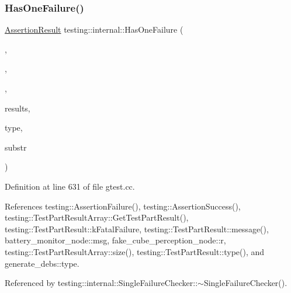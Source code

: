 \subsubsection{\texorpdfstring{Has\+One\+Failure()}{HasOneFailure()}}
{\footnotesize\ttfamily \hyperlink{classtesting_1_1AssertionResult}{Assertion\+Result} testing\+::internal\+::\+Has\+One\+Failure (\begin{DoxyParamCaption}\item[{const char $\ast$}]{,  }\item[{const char $\ast$}]{,  }\item[{const char $\ast$}]{,  }\item[{const \hyperlink{classtesting_1_1TestPartResultArray}{Test\+Part\+Result\+Array} \&}]{results,  }\item[{\hyperlink{classtesting_1_1TestPartResult_a65ae656b33fdfdfffaf34858778a52d5}{Test\+Part\+Result\+::\+Type}}]{type,  }\item[{const \hyperlink{namespacetesting_1_1internal_a8e8ff5b11e64078831112677156cb111}{string} \&}]{substr }\end{DoxyParamCaption})}



Definition at line 631 of file gtest.\+cc.



References testing\+::\+Assertion\+Failure(), testing\+::\+Assertion\+Success(), testing\+::\+Test\+Part\+Result\+Array\+::\+Get\+Test\+Part\+Result(), testing\+::\+Test\+Part\+Result\+::k\+Fatal\+Failure, testing\+::\+Test\+Part\+Result\+::message(), battery\+\_\+monitor\+\_\+node\+::msg, fake\+\_\+cube\+\_\+perception\+\_\+node\+::r, testing\+::\+Test\+Part\+Result\+Array\+::size(), testing\+::\+Test\+Part\+Result\+::type(), and generate\+\_\+debs\+::type.



Referenced by testing\+::internal\+::\+Single\+Failure\+Checker\+::$\sim$\+Single\+Failure\+Checker().


